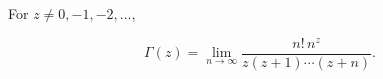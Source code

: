 For $z \neq 0, -1, -2, \ldots$,

$$\Gamma(z) = \lim_{n \to \infty} \frac{n! \, n^z}{z(z+1) \cdots (z+n)}.$$
